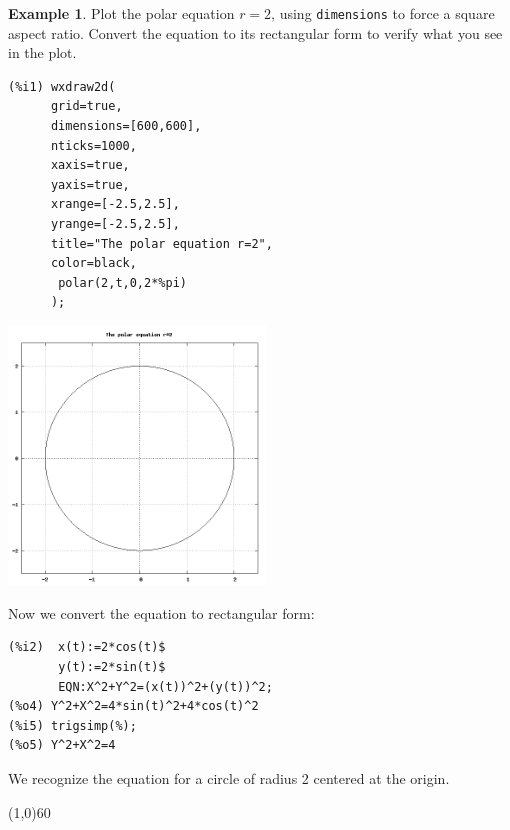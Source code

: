 \documentclass[10.5pt,twoside]{report}
\theoremstyle{definition}
\newtheorem{exmp}{Example}[section]
\begin{document}
\begin{exmp} Plot the polar equation $r=2$, using \verb|dimensions| to force a square aspect ratio.  Convert the equation to its rectangular form to verify what you see in the plot.

\begin{verbatim}
(%i1) wxdraw2d(
      grid=true,
      dimensions=[600,600],
      nticks=1000,
      xaxis=true,
      yaxis=true,
      xrange=[-2.5,2.5],
      yrange=[-2.5,2.5],
      title="The polar equation r=2",
      color=black,
       polar(2,t,0,2*%pi)
      );
\end{verbatim}

\includegraphics[width=2.7in]{example_5_3_3_1}

Now we convert the equation to rectangular form:

\begin{verbatim}
(%i2)  x(t):=2*cos(t)$
       y(t):=2*sin(t)$
       EQN:X^2+Y^2=(x(t))^2+(y(t))^2;
(%o4) Y^2+X^2=4*sin(t)^2+4*cos(t)^2
(%i5) trigsimp(%);
(%o5) Y^2+X^2=4
\end{verbatim}

We recognize the equation for a circle of radius 2 centered at the origin.

\end{exmp}

\line(1,0){60}
\linethickness{0.5mm}
\end{document}
